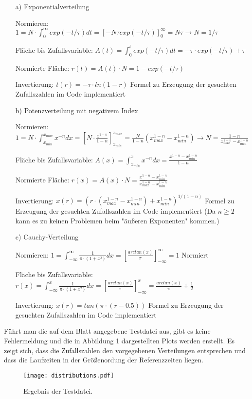 \documentclass[11pt,a4paper]{article}
\begin{document}
	\begin{itemize}
		\item[a)] Exponentialverteilung

		Normieren: $1 = N\cdot \int_0^{\infty} exp(-t/\tau)dt = [-N \tau exp(-t/\tau)]_0^{\infty} = N \tau
					\to N = 1/\tau $

		Fläche bis Zufallsvariable: $A(t) = \int_0^{t} exp(-t/\tau)dt = - \tau \cdot exp(-t/\tau) + \tau $

		Normierte Fläche: $r(t) = A(t) \cdot N = 1 - exp(-t/\tau)$

		Invertierung: $t(r) = -\tau \cdot ln(1-r)$ \to Formel zu Erzeugung der gesuchten Zufallszahlen \to im Code implementiert


		\item[b)] Potenzverteilung mit negativem Index

		Normieren: $1 = N\cdot \int_{x_{min}}^{x_{max}} x^{-n}dx = [N \cdot \frac{x^{1-n}}{1-n}]_{x_{min}}^{x_{max}} = \frac{N}{1-n} (x_{max}^{1-n} - x_{min}^{1-n})
					\to N = \frac{1-n}{x_{max}^{1-n} - x_{min}^{1-n}} $

		Fläche bis Zufallsvariable: $A(x) = \int_{x_{min}}^{x} x^{-n}dx = \frac{x^{1-n} - x_{min}^{1-n}}{1-n} $

		Normierte Fläche: $r(x) = A(x) \cdot N = \frac{x^{1-n} - x_{min}^{1-n} }{x_{max}^{1-n} - x_{min}^{1-n}}$

		Invertierung: $x(r) = (r \cdot (x_{max}^{1-n} - x_{min}^{1-n}) + x_{min}^{1-n})^{1/(1-n)}$
		\to Formel zu Erzeugung der gesuchten Zufallszahlen \to im Code implementiert (Da $n \geq 2$ kann es zu keinen Problemen beim "äußeren Exponenten" kommen.)

		\item[c)] Cauchy-Verteilung

		Normieren: $1 = \int_{-\infty}^{\infty} \frac{1}{\pi \cdot (1+x²)} dx = [\frac{arctan(x)}{\pi}]_{- \infty}^{\infty} = 1$ \to Normiert

		Fläche bis Zufallsvariable: $r(x) = \int_{-\infty}^{x} \frac{1}{\pi \cdot (1+x²)} dx = [\frac{arctan(x)}{\pi}]_{- \infty}^{x} = \frac{arctan(x)}{\pi} + \frac{1}{2}$

		Invertierung: $x(r) = tan(\pi \cdot (r - 0.5))$
		\to Formel zu Erzeugung der gesuchten Zufallszahlen \to im Code implementiert
	\end{itemize}

	Führt man die auf dem Blatt angegebene Testdatei aus, gibt es keine Fehlermeldung und die in Abbildung 1 dargestellten
	Plots werden erstellt. Es zeigt sich, dass die Zufallszahlen den vorgegebenen Verteilungen entsprechen und dass die Laufzeiten
	in der Größenordung der Referenzzeiten liegen.

	\begin{figure}[h]
		\centering
		\texttt{[image: distributions.pdf]}
		\caption{Ergebnis der Testdatei.}
	\end{figure}
\end{document}
